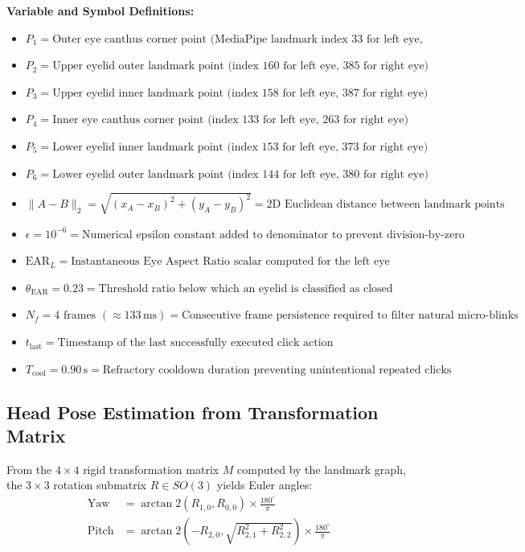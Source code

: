 \documentclass[11pt,a4paper]{article}
\begin{document}
\textbf{Variable and Symbol Definitions:}
\begin{itemize}
    \item $P_1 = \text{Outer eye canthus corner point (MediaPipe landmark index 33 for left eye, 362 for right eye)}$
    \item $P_2 = \text{Upper eyelid outer landmark point (index 160 for left eye, 385 for right eye)}$
    \item $P_3 = \text{Upper eyelid inner landmark point (index 158 for left eye, 387 for right eye)}$
    \item $P_4 = \text{Inner eye canthus corner point (index 133 for left eye, 263 for right eye)}$
    \item $P_5 = \text{Lower eyelid inner landmark point (index 153 for left eye, 373 for right eye)}$
    \item $P_6 = \text{Lower eyelid outer landmark point (index 144 for left eye, 380 for right eye)}$
    \item $\|A - B\|_2 = \sqrt{(x_A - x_B)^2 + (y_A - y_B)^2} = \text{2D Euclidean distance between landmark points}$
    \item $\epsilon = 10^{-6} = \text{Numerical epsilon constant added to denominator to prevent division-by-zero}$
    \item $\text{EAR}_L = \text{Instantaneous Eye Aspect Ratio scalar computed for the left eye}$
    \item $\theta_{\text{EAR}} = 0.23 = \text{Threshold ratio below which an eyelid is classified as closed}$
    \item $N_f = 4 \text{ frames } (\approx 133\,\text{ms}) = \text{Consecutive frame persistence required to filter natural micro-blinks}$
    \item $t_{\text{last}} = \text{Timestamp of the last successfully executed click action}$
    \item $T_{\text{cool}} = 0.90\,\text{s} = \text{Refractory cooldown duration preventing unintentional repeated clicks}$
\end{itemize}

\subsection{Head Pose Estimation from Transformation Matrix}
From the $4 \times 4$ rigid transformation matrix $M$ computed by the landmark graph, the $3 \times 3$ rotation submatrix $R \in SO(3)$ yields Euler angles:
\begin{align}
\text{Yaw}   &= \arctan2\left(R_{1,0}, R_{0,0}\right) \times \frac{180^\circ}{\pi} \\
\text{Pitch} &= \arctan2\left(-R_{2,0}, \sqrt{R_{2,1}^2 + R_{2,2}^2}\right) \times \frac{180^\circ}{\pi}
\end{align}
\end{document}
